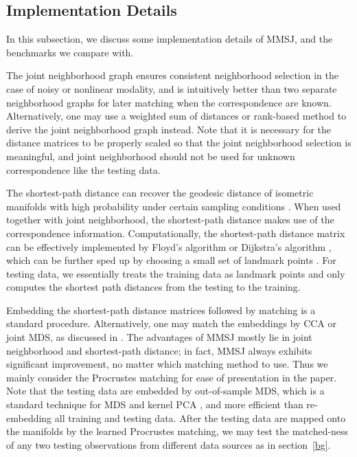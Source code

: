 \documentclass[times,twocolumn,final]{elsarticle}
\begin{document}
\subsection{Implementation Details}
\label{discuss}
In this subsection, we discuss some implementation details of MMSJ, and the benchmarks we compare with.

The joint neighborhood graph ensures consistent neighborhood selection in the case of noisy or nonlinear modality, and is intuitively better than two separate neighborhood graphs for later matching when the correspondence are known. Alternatively, one may use a weighted sum of distances or rank-based method to derive the joint neighborhood graph instead. Note that it is necessary for the distance matrices to be properly scaled so that the joint neighborhood selection is meaningful, and joint neighborhood should not be used for unknown correspondence like the testing data. 

The shortest-path distance can recover the geodesic distance of isometric manifolds with high probability under certain sampling conditions \citep{BernsteinEtAl2000, SilvaTenenbaum2003}. When used together with joint neighborhood, the shortest-path distance makes use of the correspondence information. Computationally, the shortest-path distance matrix can be effectively implemented by Floyd's algorithm or Dijkstra's algorithm \citep{TenenbaumSilvaLangford2000}, which can be further sped up by choosing a small set of landmark points \citep{SilvaTenenbaum2003, BengioEtal2003}. For testing data, we essentially treats the training data as landmark points and only computes the shortest path distances from the testing to the training.

Embedding the shortest-path distance matrices followed by matching is a standard procedure. Alternatively, one may match the embeddings by CCA or joint MDS, as discussed in \citep{PriebeMarchette2012, FishkindShenPriebe2016}. The advantages of MMSJ mostly lie in joint neighborhood and shortest-path distance; in fact, MMSJ always exhibits significant improvement, no matter which matching method to use. Thus we mainly consider the Procrustes matching for ease of presentation in the paper. Note that the testing data are embedded by out-of-sample MDS, which is a standard technique for MDS and kernel PCA \citep{ScholkopfSmolaMuller1998,BengioEtal2003,TrossetPriebe2008}, and more efficient than re-embedding all training and testing data. After the testing data are mapped onto the manifolds by the learned Procrustes matching, we may test the matched-ness of any two testing observations from different data sources as in section~\ref{bg}.
\end{document}
